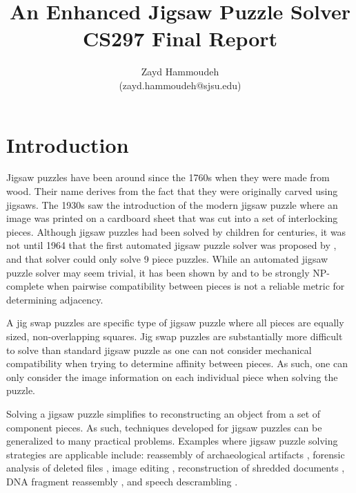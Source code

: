 \documentclass{report}
\title{An Enhanced Jigsaw Puzzle Solver \\[1in]
	   CS297 Final Report}
\author{
  Zayd Hammoudeh \\
  (zayd.hammoudeh@sjsu.edu)
  }
\begin{document}
\maketitle


\tableofcontents{\protect\newpage}

\listoffigures
\newpage
 

\renewcommand\thesection{\arabic{section}}

\section{Introduction}\label{sec:introduction}

Jigsaw puzzles have been around since the 1760s when they were made from wood.  Their name derives from the fact that they were originally carved using jigsaws.   The 1930s saw the introduction of the modern jigsaw puzzle where an image was printed on a cardboard sheet that was cut into a set of interlocking pieces.  Although jigsaw puzzles had been solved by children for centuries, it was not until 1964 that the first automated jigsaw puzzle solver was proposed by \cite{freeman1964}, and that solver could only solve 9 piece puzzles.  While an automated jigsaw puzzle solver may seem trivial, it has been shown by \cite{altman1990} and \cite{demaine2007} to be strongly NP-complete when pairwise compatibility between pieces is not a reliable metric for determining adjacency.

A jig swap puzzles are specific type of jigsaw puzzle where  all pieces are equally sized, non-overlapping squares.  Jig swap puzzles are substantially more difficult to solve than standard jigsaw puzzle as one can not consider mechanical compatibility when trying to determine affinity between pieces.  As such, one can only consider the image information on each individual piece when solving the puzzle.  

Solving a jigsaw puzzle simplifies to reconstructing an object from a set of component pieces.  As such, techniques developed for jigsaw puzzles can be generalized to many practical problems.  Examples where jigsaw puzzle solving strategies are applicable include: reassembly of archaeological artifacts \cite{brown2008, koller2006}, forensic analysis of deleted files \cite{garfinkel2010}, image editing \cite{cho2008}, reconstruction of shredded documents \cite{zhu2008}, DNA fragment reassembly \cite{marande2007}, and speech descrambling \cite{zhao2007}.
\end{document}
